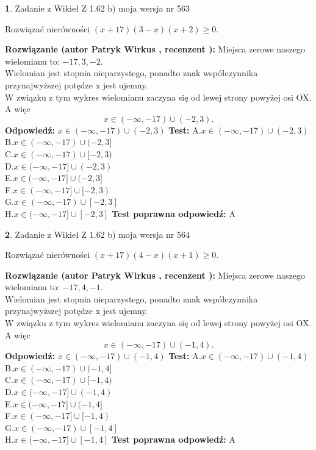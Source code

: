 \documentclass[12pt, a4paper]{article}
\theoremstyle{definition} %
\newtheorem{zad}{}
\newcommand{\zadStart}[1]{\begin{zad}#1\newline}
\newcommand{\zadStop}{\end{zad}}
\newcommand{\rozwStart}[2]{\noindent \textbf{Rozwiązanie (autor #1 , recenzent #2): }\newline}
\newcommand{\rozwStop}{\newline}
\newcommand{\odpStart}{\noindent \textbf{Odpowiedź:}\newline}
\newcommand{\odpStop}{\newline}
\newcommand{\testStart}{\noindent \textbf{Test:}\newline}
\newcommand{\testStop}{\newline}
\newcommand{\kluczStart}{\noindent \textbf{Test poprawna odpowiedź:}\newline}
\newcommand{\kluczStop}{\newline}
\begin{document}
\zadStart{Zadanie z Wikieł Z 1.62 b) moja wersja nr 563}

Rozwiązać nierówności $(x+17)(3-x)(x+2)\ge0$.
\zadStop
\rozwStart{Patryk Wirkus}{}
Miejsca zerowe naszego wielomianu to: $-17, 3, -2$.\\
Wielomian jest stopnia nieparzystego, ponadto znak współczynnika przy\linebreak najwyższej potędze x jest ujemny.\\ W związku z tym wykres wielomianu zaczyna się od lewej strony powyżej osi OX. A więc $$x \in (-\infty,-17) \cup (-2,3).$$
\rozwStop
\odpStart
$x \in (-\infty,-17) \cup (-2,3)$
\odpStop
\testStart
A.$x \in (-\infty,-17) \cup (-2,3)$\\
B.$x \in (-\infty,-17) \cup (-2,3]$\\
C.$x \in (-\infty,-17) \cup [-2,3)$\\
D.$x \in (-\infty,-17] \cup (-2,3)$\\
E.$x \in (-\infty,-17] \cup (-2,3]$\\
F.$x \in (-\infty,-17] \cup [-2,3)$\\
G.$x \in (-\infty,-17) \cup [-2,3]$\\
H.$x \in (-\infty,-17] \cup [-2,3]$
\testStop
\kluczStart
A
\kluczStop



\zadStart{Zadanie z Wikieł Z 1.62 b) moja wersja nr 564}

Rozwiązać nierówności $(x+17)(4-x)(x+1)\ge0$.
\zadStop
\rozwStart{Patryk Wirkus}{}
Miejsca zerowe naszego wielomianu to: $-17, 4, -1$.\\
Wielomian jest stopnia nieparzystego, ponadto znak współczynnika przy\linebreak najwyższej potędze x jest ujemny.\\ W związku z tym wykres wielomianu zaczyna się od lewej strony powyżej osi OX. A więc $$x \in (-\infty,-17) \cup (-1,4).$$
\rozwStop
\odpStart
$x \in (-\infty,-17) \cup (-1,4)$
\odpStop
\testStart
A.$x \in (-\infty,-17) \cup (-1,4)$\\
B.$x \in (-\infty,-17) \cup (-1,4]$\\
C.$x \in (-\infty,-17) \cup [-1,4)$\\
D.$x \in (-\infty,-17] \cup (-1,4)$\\
E.$x \in (-\infty,-17] \cup (-1,4]$\\
F.$x \in (-\infty,-17] \cup [-1,4)$\\
G.$x \in (-\infty,-17) \cup [-1,4]$\\
H.$x \in (-\infty,-17] \cup [-1,4]$
\testStop
\kluczStart
A
\kluczStop
\end{document}

